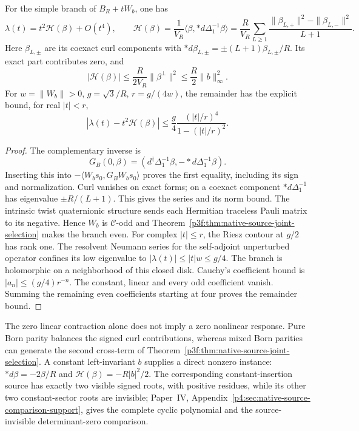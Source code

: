 \documentclass[11pt,a4paper]{article}
\begin{document}
\begin{theorem}
\label{p3f:thm:native-source-helicity-coefficient}
For the simple branch of \(B_R+tW_b\), one has
\begin{equation}
 \lambda(t)=t^2\mathcal H(\beta)+O(t^4),\qquad
 \mathcal H(\beta)=\frac1{V_R}
    \langle\beta,*d\Delta_1^{-1}\beta\rangle
 =\frac R{V_R}\sum_{L\ge1}
     \frac{\|\beta_{L,+}\|^2-\|\beta_{L,-}\|^2}{L+1}.
 \label{p3f:eq:native-source-helicity-coefficient}
\end{equation}
Here \(\beta_{L,\pm}\) are its coexact curl components with
\(*d\beta_{L,\pm}=\pm(L+1)\beta_{L,\pm}/R\).
Its exact part contributes zero, and
\begin{equation}
 |\mathcal H(\beta)|\le\frac R{2V_R}\|\beta^\perp\|^2
            \le\frac R2\|b\|_\infty^2.
 \label{p3f:eq:native-source-helicity-bound}
\end{equation}
For \(w=\|W_b\|>0\), \(g=\sqrt3/R\), \(r=g/(4w)\), the
remainder has the explicit bound, for real \(|t|<r\),
\begin{equation}
 |\lambda(t)-t^2\mathcal H(\beta)|
 \le\frac g4\frac{(|t|/r)^4}{1-(|t|/r)^2}.
 \label{p3f:eq:native-source-quartic-error}
\end{equation}
\end{theorem}
\begin{proof}
The complementary inverse is
\[
 G_B(0,\beta)=(d^\dagger\Delta_1^{-1}\beta,
                         -*d\Delta_1^{-1}\beta).
\]
Inserting this into
\(-\langle W_bs_0,G_BW_bs_0\rangle\) proves the first equality,
including its sign and normalization. Curl vanishes on exact forms;
on a coexact component \(*d\Delta_1^{-1}\) has eigenvalue
\(\pm R/(L+1)\). This gives the series and its norm bound.
The intrinsic twist quaternionic structure sends each Hermitian
traceless Pauli matrix to its negative. Hence \(W_b\) is
\(\mathcal C\)-odd and
Theorem~\ref{p3f:thm:native-source-joint-selection} makes the branch even.
For complex \(|t|\le r\), the Riesz contour at \(g/2\) has rank one.
The resolvent Neumann series for the self-adjoint unperturbed operator
confines its low eigenvalue to \(|\lambda(t)|\le|t|w\le g/4\).
The branch is holomorphic on a neighborhood of this closed disk.
Cauchy's coefficient bound is \(|a_n|\le(g/4)r^{-n}\).
The constant, linear and every odd coefficient vanish. Summing the
remaining even coefficients starting at four proves the remainder bound.
\end{proof}

The zero linear contraction alone does not imply a zero nonlinear
response. Pure Born parity balances the signed curl contributions,
whereas mixed Born parities can generate the second cross-term of
Theorem~\ref{p3f:thm:native-source-joint-selection}. A constant
left-invariant \(b\) supplies a direct nonzero instance:
\(*d\beta=-2\beta/R\) and
\(\mathcal H(\beta)=-R|b|^2/2\). The corresponding constant-insertion source has exactly two visible
signed roots, with positive residues, while its other two constant-sector
roots are invisible; Paper~IV,
Appendix~\ref{p4:sec:native-source-comparison-support}, gives the complete
cyclic polynomial and the source-invisible determinant-zero comparison.
\end{document}

